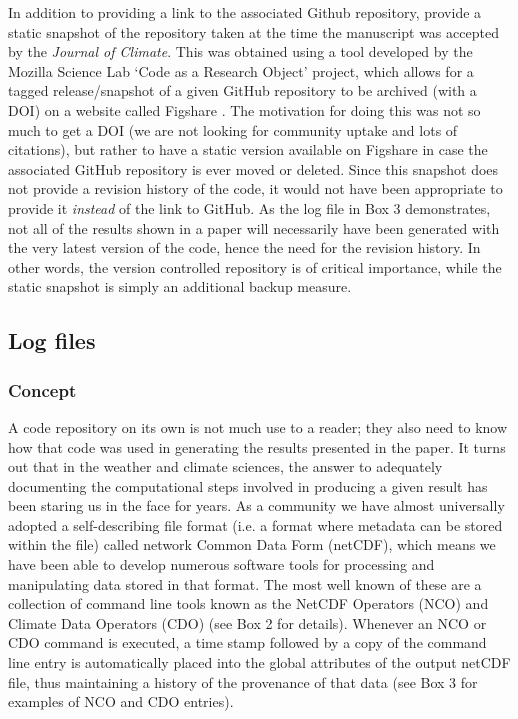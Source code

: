 In addition to providing a link to the associated Github repository, \citet{Irving2015} provide a static snapshot of the repository taken at the time the manuscript was accepted by the \textit{Journal of Climate}. This was obtained using a tool developed by the Mozilla Science Lab `Code as a Research Object' project, which allows for a tagged release/snapshot of a given GitHub repository to be archived (with a DOI) on a website called Figshare \citep{MSL2015}. The motivation for doing this was not so much to get a DOI (we are not looking for community uptake and lots of citations), but rather to have a static version available on Figshare in case the associated GitHub repository is ever moved or deleted. Since this snapshot does not provide a revision history of the code, it would not have been appropriate to provide it \textit{instead} of the link to GitHub. As the log file in Box 3 demonstrates, not all of the results shown in a paper will necessarily have been generated with the very latest version of the code, hence the need for the revision history. In other words, the version controlled repository is of critical importance, while the static snapshot is simply an additional backup measure.  

\subsection{Log files}\label{s:log_files}

\subsubsection{Concept}
A code repository on its own is not much use to a reader; they also need to know how that code was used in generating the results presented in the paper. It turns out that in the weather and climate sciences, the answer to adequately documenting the computational steps involved in producing a given result has been staring us in the face for years. As a community we have almost universally adopted a self-describing file format (i.e. a format where metadata can be stored within the file) called network Common Data Form (netCDF), which means we have been able to develop numerous software tools for processing and manipulating data stored in that format. The most well known of these are a collection of command line tools known as the NetCDF Operators (NCO) and Climate Data Operators (CDO) (see Box 2 for details). Whenever an NCO or CDO command is executed, a time stamp followed by a copy of the command line entry is automatically placed into the global attributes of the output netCDF file, thus maintaining a history of the provenance of that data (see Box 3 for examples of NCO and CDO entries).

